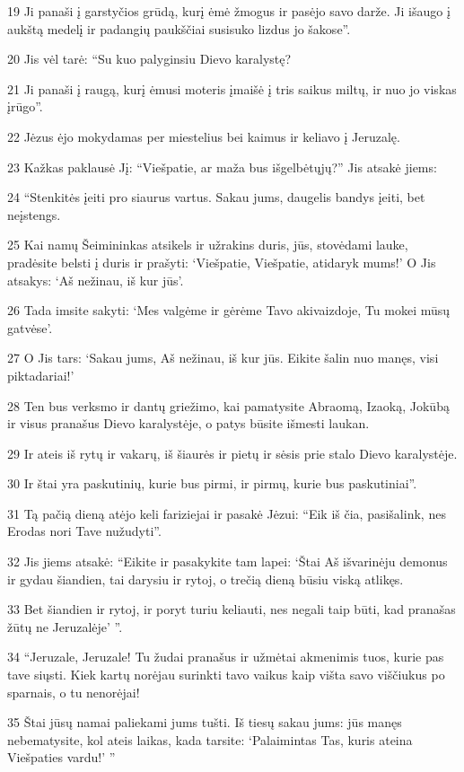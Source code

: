 \par 19 Ji panaši į garstyčios grūdą, kurį ėmė žmogus ir pasėjo savo darže. Ji išaugo į aukštą medelį ir padangių paukščiai susisuko lizdus jo šakose”. 
\par 20 Jis vėl tarė: “Su kuo palyginsiu Dievo karalystę? 
\par 21 Ji panaši į raugą, kurį ėmusi moteris įmaišė į tris saikus miltų, ir nuo jo viskas įrūgo”. 
\par 22 Jėzus ėjo mokydamas per miestelius bei kaimus ir keliavo į Jeruzalę. 
\par 23 Kažkas paklausė Jį: “Viešpatie, ar maža bus išgelbėtųjų?” Jis atsakė jiems: 
\par 24 “Stenkitės įeiti pro siaurus vartus. Sakau jums, daugelis bandys įeiti, bet neįstengs. 
\par 25 Kai namų Šeimininkas atsikels ir užrakins duris, jūs, stovėdami lauke, pradėsite belsti į duris ir prašyti: ‘Viešpatie, Viešpatie, atidaryk mums!’ O Jis atsakys: ‘Aš nežinau, iš kur jūs’. 
\par 26 Tada imsite sakyti: ‘Mes valgėme ir gėrėme Tavo akivaizdoje, Tu mokei mūsų gatvėse’. 
\par 27 O Jis tars: ‘Sakau jums, Aš nežinau, iš kur jūs. Eikite šalin nuo manęs, visi piktadariai!’ 
\par 28 Ten bus verksmo ir dantų griežimo, kai pamatysite Abraomą, Izaoką, Jokūbą ir visus pranašus Dievo karalystėje, o patys būsite išmesti laukan. 
\par 29 Ir ateis iš rytų ir vakarų, iš šiaurės ir pietų ir sėsis prie stalo Dievo karalystėje. 
\par 30 Ir štai yra paskutinių, kurie bus pirmi, ir pirmų, kurie bus paskutiniai”. 
\par 31 Tą pačią dieną atėjo keli fariziejai ir pasakė Jėzui: “Eik iš čia, pasišalink, nes Erodas nori Tave nužudyti”. 
\par 32 Jis jiems atsakė: “Eikite ir pasakykite tam lapei: ‘Štai Aš išvarinėju demonus ir gydau šiandien, tai darysiu ir rytoj, o trečią dieną būsiu viską atlikęs. 
\par 33 Bet šiandien ir rytoj, ir poryt turiu keliauti, nes negali taip būti, kad pranašas žūtų ne Jeruzalėje’ ”. 
\par 34 “Jeruzale, Jeruzale! Tu žudai pranašus ir užmėtai akmenimis tuos, kurie pas tave siųsti. Kiek kartų norėjau surinkti tavo vaikus kaip višta savo viščiukus po sparnais, o tu nenorėjai! 
\par 35 Štai jūsų namai paliekami jums tušti. Iš tiesų sakau jums: jūs manęs nebematysite, kol ateis laikas, kada tarsite: ‘Palaimintas Tas, kuris ateina Viešpaties vardu!’ ”



